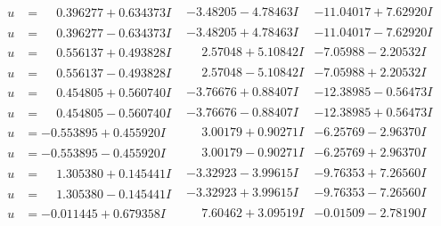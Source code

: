 \documentclass[1p]{elsarticle_modified}
\theoremstyle{definition}
\begin{document}
$$\begin{array}{c|c|c}
\begin{aligned}
u &= \phantom{-}0.396277 + 0.634373 I\end{aligned}
 & -3.48205 - 4.78463 I & -11.04017 + 7.62920 I \\ \hline\begin{aligned}
u &= \phantom{-}0.396277 - 0.634373 I\end{aligned}
 & -3.48205 + 4.78463 I & -11.04017 - 7.62920 I \\ \hline\begin{aligned}
u &= \phantom{-}0.556137 + 0.493828 I\end{aligned}
 & \phantom{-}2.57048 + 5.10842 I & -7.05988 - 2.20532 I \\ \hline\begin{aligned}
u &= \phantom{-}0.556137 - 0.493828 I\end{aligned}
 & \phantom{-}2.57048 - 5.10842 I & -7.05988 + 2.20532 I \\ \hline\begin{aligned}
u &= \phantom{-}0.454805 + 0.560740 I\end{aligned}
 & -3.76676 + 0.88407 I & -12.38985 - 0.56473 I \\ \hline\begin{aligned}
u &= \phantom{-}0.454805 - 0.560740 I\end{aligned}
 & -3.76676 - 0.88407 I & -12.38985 + 0.56473 I \\ \hline\begin{aligned}
u &= -0.553895 + 0.455920 I\end{aligned}
 & \phantom{-}3.00179 + 0.90271 I & -6.25769 - 2.96370 I \\ \hline\begin{aligned}
u &= -0.553895 - 0.455920 I\end{aligned}
 & \phantom{-}3.00179 - 0.90271 I & -6.25769 + 2.96370 I \\ \hline\begin{aligned}
u &= \phantom{-}1.305380 + 0.145441 I\end{aligned}
 & -3.32923 - 3.99615 I & -9.76353 + 7.26560 I \\ \hline\begin{aligned}
u &= \phantom{-}1.305380 - 0.145441 I\end{aligned}
 & -3.32923 + 3.99615 I & -9.76353 - 7.26560 I \\ \hline\begin{aligned}
u &= -0.011445 + 0.679358 I\end{aligned}
 & \phantom{-}7.60462 + 3.09519 I & -0.01509 - 2.78190 I \\ \hline\begin{aligned}

\end{aligned}
\end{array}$$
\end{document}
